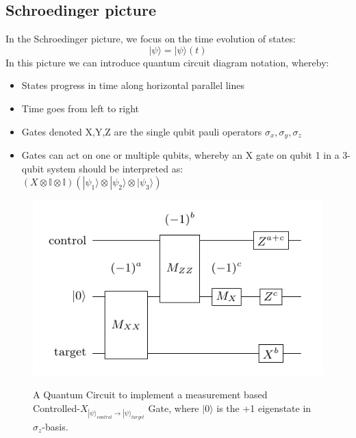 \subsection{Schroedinger picture}
In the Schroedinger picture, we focus on the time evolution of states:
\begin{equation}  
	|\psi\rangle = |\psi\rangle(t) 
\end{equation}
In this picture we can introduce quantum circuit diagram notation, whereby:
\begin{itemize}
	\item States progress in time along horizontal parallel lines
	\item Time goes from left to right
	\item Gates denoted X,Y,Z are the single qubit pauli operators
		$\sigma_x,\sigma_y,\sigma_z$
	\item Gates can act on one or multiple qubits, whereby an X gate 
		on qubit 1 in a 3-qubit system should be interpreted as:
		\\$(X\otimes \mathbb{I} \otimes \mathbb{I}) (|\psi_1\rangle
		\otimes |\psi_2\rangle \otimes |\psi_3\rangle)$
\end{itemize}
\begin{figure}[h!]
	\begin{center}
	\captionsetup{justification=centering,margin=2cm}
	\includegraphics[scale=0.4]{img/cnotMeasureCircuit.png}\\
	\caption{A Quantum Circuit to implement a measurement based\\
		Controlled-$X_{|\psi\rangle_{control}\rightarrow |\psi\rangle_{target}}$ Gate,
		where $|0\rangle$ is the +1 eigenstate in $\sigma_{z}$-basis.}
	\label{fig:circuit1}
	\end{center}
\end{figure}
\newpage

